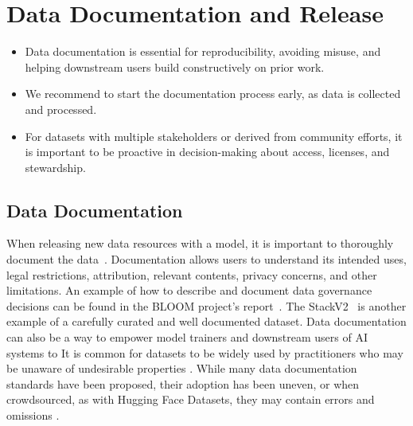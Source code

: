 \section{Data Documentation and Release}
\label{sec:documentation}
\vspace{-2mm}

\begin{tcolorbox}[
    width=\textwidth,
    title={Documentation Best Practices},
    colback=backgroundcol, %
    colframe=darkgray, %
    colbacktitle=dataprep, %
    coltitle=white, %
    coltext=black %
]

\begin{itemize}[itemsep=0pt, wide=3pt]    
    \item Data documentation is essential for reproducibility, avoiding misuse, and helping downstream users build constructively on prior work.
    \item We recommend to start the documentation process early, as data is collected and processed.
    \item For datasets with multiple stakeholders or derived from community efforts, it is important to be proactive in decision-making about access, licenses, and stewardship.
\end{itemize}
\end{tcolorbox}


\subsection{Data Documentation}

When releasing new data resources with a model, it is important to thoroughly document the data~\citep{bender-friedman-2018-data,holland2020dataset,gebru2021datasheets,bommasani2024foundation}. Documentation allows users to understand its intended uses, legal restrictions, attribution, relevant contents, privacy concerns, and other limitations. An example of how to describe and document data governance decisions can be found in the BLOOM project's report~\citep{jernite2022data}. The StackV2~\citep{lozhkov2024starcoder} is another example of a carefully curated and well documented dataset. Data documentation can also be a way to empower model trainers and downstream users of AI systems to 
It is common for datasets to be widely used by practitioners who may be unaware of undesirable properties \citep{David2023AIDatasetCSAM}. While many data documentation standards have been proposed, their adoption has been uneven, or when crowdsourced, as with Hugging Face Datasets, they may contain errors and omissions \citep{lhoest2021datasets, longpre2023data}.

